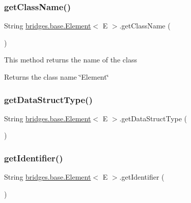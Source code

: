\subsubsection{\texorpdfstring{get\+Class\+Name()}{getClassName()}}
{\footnotesize\ttfamily String \hyperlink{classbridges_1_1base_1_1_element}{bridges.\+base.\+Element}$<$ E $>$.get\+Class\+Name (\begin{DoxyParamCaption}{ }\end{DoxyParamCaption})}

This method returns the name of the class \begin{DoxyReturn}{Returns}
the class name \char`\"{}\+Element\char`\"{} 
\end{DoxyReturn}
\hypertarget{classbridges_1_1base_1_1_element_a6a1b70fa4b1936d10c6deb433acf8cd9}{}\label{classbridges_1_1base_1_1_element_a6a1b70fa4b1936d10c6deb433acf8cd9} 
\subsubsection{\texorpdfstring{get\+Data\+Struct\+Type()}{getDataStructType()}}
{\footnotesize\ttfamily String \hyperlink{classbridges_1_1base_1_1_element}{bridges.\+base.\+Element}$<$ E $>$.get\+Data\+Struct\+Type (\begin{DoxyParamCaption}{ }\end{DoxyParamCaption})\hspace{0.3cm}{\ttfamily [protected]}}

\hypertarget{classbridges_1_1base_1_1_element_ad5496f568b4cca3909800eceea5fb47d}{}\label{classbridges_1_1base_1_1_element_ad5496f568b4cca3909800eceea5fb47d} 
\subsubsection{\texorpdfstring{get\+Identifier()}{getIdentifier()}}
{\footnotesize\ttfamily String \hyperlink{classbridges_1_1base_1_1_element}{bridges.\+base.\+Element}$<$ E $>$.get\+Identifier (\begin{DoxyParamCaption}{ }\end{DoxyParamCaption})}


